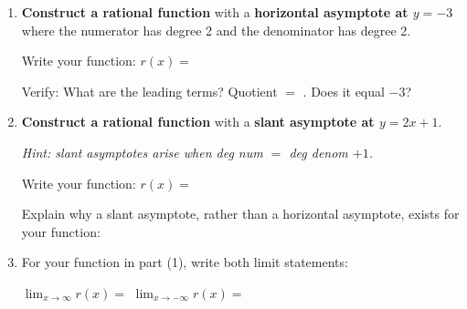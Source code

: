 \documentclass[10pt]{article}
\begin{document}
\begin{tcolorbox}[colback=white, colframe=black!40,
    title=\textbf{Tier E --- Extend},
    fonttitle=\bfseries, arc=2mm, left=3mm, right=3mm, top=2mm, bottom=2mm]

\begin{enumerate}[itemsep=10pt]
  \item \textbf{Construct a rational function} with a \textbf{horizontal asymptote at $y = -3$}
        where the numerator has degree 2 and the denominator has degree 2.

        Write your function: $r(x) = $ \blank{6cm}

        Verify: What are the leading terms?  Quotient $=$ \blank{2cm}. Does it equal $-3$? \blank{1.5cm}

  \item \textbf{Construct a rational function} with a \textbf{slant asymptote at $y = 2x + 1$}.

        \textit{Hint: slant asymptotes arise when deg num $=$ deg denom $+ 1$.}

        Write your function: $r(x) = $ \blank{6cm}

        Explain why a slant asymptote, rather than a horizontal asymptote, exists for your function:

  \item For your function in part (1), write both limit statements:

        $\displaystyle\lim_{x\to\infty} r(x) = $ \blank{2cm}
        \qquad
        $\displaystyle\lim_{x\to -\infty} r(x) = $ \blank{2cm}
\end{enumerate}
\end{tcolorbox}
\end{document}
